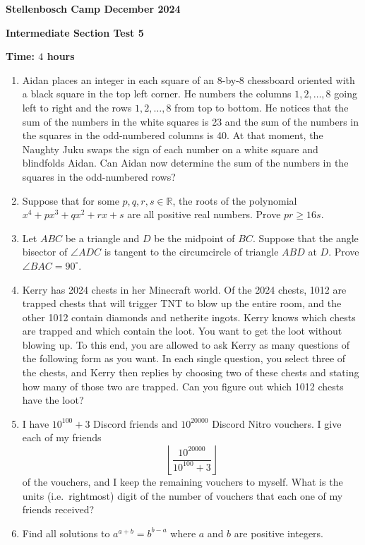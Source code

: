 \documentclass[12pt]{article}
\begin{document}
\begin{center} \large
    \textbf{Stellenbosch Camp December 2024}
    
    \textbf{Intermediate Section Test 5}
    
    \textbf{Time: \(4\) hours}
\end{center}

\begin{enumerate}[topsep=2\bigskipamount,itemsep=\bigskipamount]
\item Aidan places an integer in each square of an 8-by-8 chessboard oriented with a black square in the top left corner. He numbers the columns $1,2,\ldots,8$ going left to right and the rows $1,2,\ldots,8$ from top to bottom. He notices that the sum of the numbers in the white squares is 23 and the sum of the numbers in the squares in the odd-numbered columns is 40. At that moment, the Naughty Juku swaps the sign of each number on a white square and blindfolds Aidan. Can Aidan now determine the sum of the numbers in the squares in the odd-numbered rows?

\item %
Suppose that for some $p, q, r, s \in \mathbb{R}$, the roots of the polynomial $x^{4} + px^{3} + qx^{2} + rx + s$ are all positive real numbers. Prove $pr \geqslant 16s$.

\item %
Let $ABC$ be a triangle and $D$ be the midpoint of $BC$. Suppose that the angle bisector of $\angle{ADC}$ is tangent to the circumcircle of triangle $ABD$ at $D$. Prove $\angle{BAC} = 90^{\circ}$.

\item Kerry has 2024 chests in her Minecraft world.
Of the 2024 chests, 1012 are trapped chests that will trigger TNT to blow up the entire room, and the other 1012 contain diamonds and netherite ingots.
Kerry knows which chests are trapped and which contain the loot.
You want to get the loot without blowing up.
To this end, you are allowed to ask Kerry as many questions of the following form as you want.
In each single question, you select three of the chests, and Kerry then replies by choosing two of these chests and stating how many of those two are trapped.
Can you figure out which 1012 chests have the loot?

\item I have $10^{100}+3$ Discord friends and $10^{20000}$ Discord Nitro vouchers.
I give each of my friends
\[\left\lfloor\frac{10^{20000}}{10^{100} + 3}\right\rfloor\]
of the vouchers, and I keep the remaining vouchers to myself.
What is the units (i.e.~rightmost) digit of the number of vouchers that each one of my friends received?

\item Find all solutions to $a^{a+b} = b^{b-a}$ where $a$ and $b$ are positive integers.
\end{enumerate}
\end{document}
